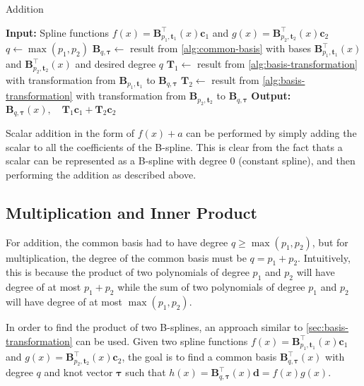 \begin{algorithm}
    \caption{Addition}\label{alg:addition}
    \begin{algorithmic}[1]
        \State \textbf{Input:} Spline functions $f(x) = \mathbf{B}_{p_1, \mathbf{t}_1}^{\top}(x) \mathbf{c}_1$ and $g(x) = \mathbf{B}_{p_2, \mathbf{t}_2}^{\top}(x) \mathbf{c}_2$
        \State $q \gets \max(p_1, p_2)$
        \State $\mathbf B_{q, \boldsymbol{\tau}} \gets $ result from \cref{alg:common-basis} with bases $\mathbf{B}_{p_1, \mathbf{t}_1}^{\top}(x)$ and $\mathbf{B}_{p_2, \mathbf{t}_2}^{\top}(x)$ and desired degree $q$
        \State $\mathbf T_1 \gets $ result from \cref{alg:basis-transformation} with transformation from $\mathbf B_{p_1, \mathbf{t}_1}$ to $\mathbf B_{q, \boldsymbol{\tau}}$
        \State $\mathbf T_2 \gets $ result from \cref{alg:basis-transformation} with transformation from $\mathbf B_{p_2, \mathbf{t}_2}$ to $\mathbf B_{q, \boldsymbol{\tau}}$
        \State \textbf{Output:} $\mathbf B_{q, \boldsymbol{\tau}}(x), \quad\mathbf T_1 \mathbf c_1 + \mathbf T_2 \mathbf c_2$
    \end{algorithmic}
\end{algorithm}

Scalar addition in the form of $f(x) + a$ can be performed by simply adding the scalar to all the coefficients of the B-spline. This is clear from the fact thats a scalar can be represented as a B-spline with degree $0$ (constant spline), and then performing the addition as described above. 

\subsection{Multiplication and Inner Product}\label{sec:multiplication}

For addition, the common basis had to have degree $q \geq \max(p_1, p_2)$, but for multiplication, the degree of the common basis must be $q = p_1 + p_2$. Intuitively, this is because the product of two polynomials of degree $p_1$ and $p_2$ will have degree of at most $p_1 + p_2$ while the sum of two polynomials of degree $p_1$ and $p_2$ will have degree of at most $\max(p_1, p_2)$.

In order to find the product of two B-splines, an approach similar to \cref{sec:basis-transformation} can be used. Given two spline functions $f(x) = \mathbf{B}_{p_1, \mathbf{t}_1}^{\top}(x) \mathbf{c}_1$ and $g(x) = \mathbf{B}_{p_2, \mathbf{t}_2}^{\top}(x) \mathbf{c}_2$, the goal is to find a common basis $\mathbf{B}_{q, \boldsymbol{\tau}}^{\top}(x)$ with degree $q$ and knot vector $\boldsymbol{\tau}$ such that $h(x) = \mathbf{B}_{q, \boldsymbol{\tau}}^{\top}(x) \mathbf{d} = f(x)  g(x)$.

